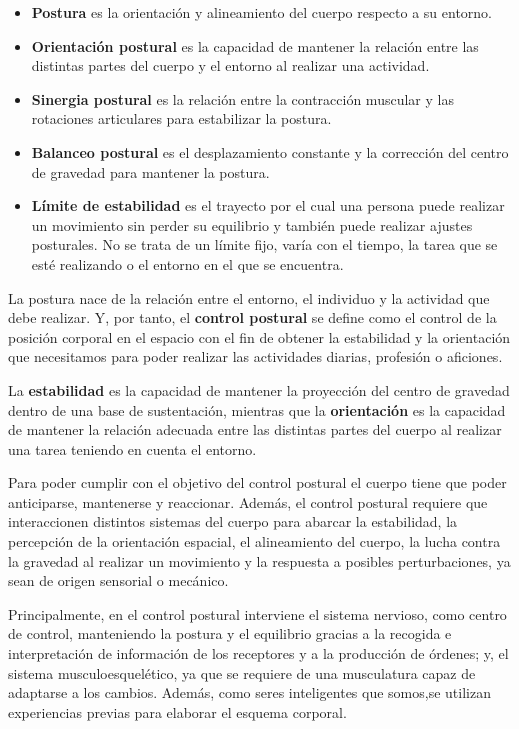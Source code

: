 \begin{itemize}
    \item \textbf{Postura} es la orientación y alineamiento del cuerpo respecto a su entorno.
    \item \textbf{Orientación postural} es la capacidad de mantener la relación entre las distintas partes del cuerpo y el entorno al realizar una actividad.
    \item \textbf{Sinergia postural} es la relación entre la contracción muscular y las rotaciones articulares para estabilizar la postura.
    \item \textbf{Balanceo postural} es el desplazamiento constante y la corrección del centro de gravedad para mantener la postura.
    \item \textbf{Límite de estabilidad} es el trayecto por el cual una persona puede realizar un movimiento sin perder su equilibrio y también puede realizar ajustes posturales. No se trata de un límite fijo, varía con el tiempo, la tarea que se esté realizando o el entorno en el que se encuentra.
\end{itemize}

La postura nace de la relación entre el entorno, el individuo y la actividad que debe realizar. Y, por tanto, el \textbf{control postural} se define como el control de la posición corporal en el espacio con el fin de obtener la estabilidad y la orientación que necesitamos para poder realizar las actividades diarias, profesión o aficiones. 

La \textbf{estabilidad} es la capacidad de mantener la proyección del centro de gravedad dentro de una base de sustentación, mientras que la \textbf{orientación} es la capacidad de mantener la relación adecuada entre las distintas partes del cuerpo al realizar una tarea teniendo en cuenta el entorno.

Para poder cumplir con el objetivo del control postural el cuerpo tiene que poder anticiparse, mantenerse y reaccionar. Además, el control postural requiere que interaccionen distintos sistemas del cuerpo para abarcar la estabilidad, la percepción de la orientación espacial, el alineamiento del cuerpo, la lucha contra la gravedad al realizar un movimiento y la respuesta a posibles perturbaciones, ya sean de origen sensorial o mecánico.

Principalmente, en el control postural interviene el sistema nervioso, como centro de control, manteniendo la postura y el equilibrio gracias a la recogida e interpretación de información de los receptores y a la producción de órdenes; y, el sistema musculoesquelético, ya que se requiere de una musculatura capaz de adaptarse a los cambios. Además, como seres inteligentes que somos,se utilizan experiencias previas para elaborar el esquema corporal.

